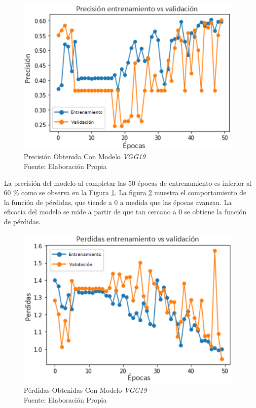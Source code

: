 \begin{figure}[ht]
	\centering
	\includegraphics[scale=0.7]{Figs/101.png}
	\caption{Precisión Obtenida Con Modelo \textit{VGG19} \\ Fuente: Elaboración Propia}
	\label{fig:VGG19_accuracy}
\end{figure}  

\vspace{0.5cm}

La precisión del modelo al completar las $50$ épocas de entrenamiento es inferior al 60 \% como se observa en la Figura \ref{fig:VGG19_accuracy}. La figura \ref{fig:VGG19_losses} muestra el comportamiento de la función de pérdidas, que tiende a $0$ a medida que las épocas avanzan. La eficacia del modelo se mide a partir de que tan cercano a $0$ se obtiene la función de pérdidas. 

\newpage
\begin{figure}[ht]
	\centering
	\includegraphics[scale=0.7]{Figs/102.png}
	\caption{Pérdidas Obtenidas Con Modelo \textit{VGG19} \\ Fuente: Elaboración Propia}
	\label{fig:VGG19_losses}
\end{figure}

